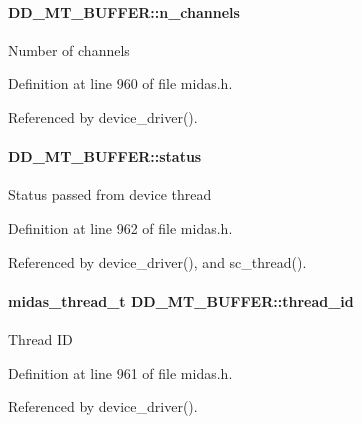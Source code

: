\paragraph[{n\_\-channels}]{ {\bf DD\_\-MT\_\-BUFFER::n\_\-channels}}\hfill\label{structDD__MT__BUFFER_a39e0e855a040ada9fdf72bebe936541e}
Number of channels 

Definition at line 960 of file midas.h.

Referenced by device\_\-driver().
\paragraph[{status}]{ {\bf DD\_\-MT\_\-BUFFER::status}}\hfill\label{structDD__MT__BUFFER_a039db8f66e6b3f5ed6c3358d6e934bb1}
Status passed from device thread 

Definition at line 962 of file midas.h.

Referenced by device\_\-driver(), and sc\_\-thread().
\paragraph[{thread\_\-id}]{\setlength{\rightskip}{0pt plus 5cm}midas\_\-thread\_\-t {\bf DD\_\-MT\_\-BUFFER::thread\_\-id}}\hfill\label{structDD__MT__BUFFER_a423b3c5c3e9c6f3c930341ea61d44fb8}
Thread ID 

Definition at line 961 of file midas.h.

Referenced by device\_\-driver().